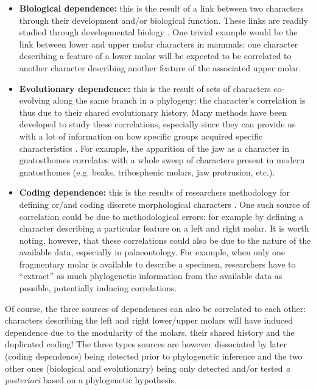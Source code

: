 \documentclass[12pt,letterpaper]{article}
\begin{document}
\begin{itemize}

    \item \textbf{Biological dependence:} this is the result of a link between two characters through their development and/or biological function.
    These links are readily studied through developmental biology \citep{goswami2006morphological,goswami2010,goswami2014macroevolutionary}.
    One trivial example would be the link between lower and upper molar characters in mammals: one character describing a feature of a lower molar will be expected to be correlated to another character describing another feature of the associated upper molar.

    \item \textbf{Evolutionary dependence:} this is the result of sets of characters co-evolving along the same branch in a phylogeny: the character's correlation is thus due to their shared evolutionary history.
    Many methods have been developed to study these correlations, especially since they can provide us with a lot of information on how specific groups acquired specific characteristics \citep{Lande1983,Maddison1990,Pagel1994,Pagel2006,Grabowski2016}.
    For example, the apparition of the jaw as a character in gnatosthomes correlates with a whole sweep of characters present in modern gnatosthomes (e.g. beaks, tribosphenic molars, jaw protrusion, etc.). %

    \item \textbf{Coding dependence:} this is the results of researchers methodology for defining or/and coding discrete morphological characters \citep{Brazeau2011,simoes2017giant}.
    One such source of correlation could be due to methodological errors: for example by defining a character describing a particular feature on a left and right molar.
    It is worth noting, however, that these correlations could also be due to the nature of the available data, especially in palaeontology.
    For example, when only one fragmentary molar is available to describe a specimen, researchers have to ``extract'' as much phylogenetic information from the available data as possible, potentially inducing correlations.
\end{itemize}

\noindent Of course, the three sources of dependences can also be correlated to each other: characters describing the left and right lower/upper molars will have induced dependence due to the modularity of the molars, their shared history and the duplicated coding!
The three types sources are however dissociated by later (coding dependence) being detected prior to phylogenetic inference and the two other ones (biological and evolutionary) being only detected and/or tested \textit{a posteriori} based on a phylogenetic hypothesis.
\end{document}
